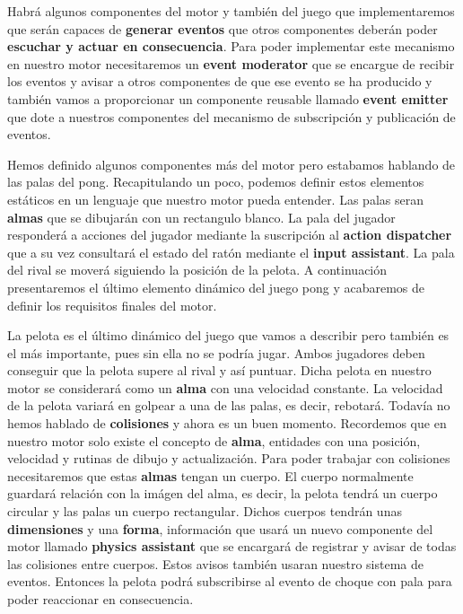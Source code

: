 \documentclass[a4paper]{article}
\begin{document}
Habrá algunos componentes del motor y también del juego que implementaremos que serán capaces de \textbf{generar eventos} que otros componentes deberán poder \textbf{escuchar y actuar en consecuencia}. Para poder implementar este mecanismo en nuestro motor necesitaremos un \textbf{event moderator} que se encargue de recibir los eventos y avisar a otros componentes de que ese evento se ha producido y también vamos a proporcionar un componente reusable llamado \textbf{event emitter} que dote a nuestros componentes del mecanismo de subscripción y publicación de eventos.

Hemos definido algunos componentes más del motor pero estabamos hablando de las palas del pong. Recapitulando un poco, podemos definir estos elementos estáticos en un lenguaje que nuestro motor pueda entender. Las palas seran \textbf{almas} que se dibujarán con un rectangulo blanco. La pala del jugador responderá a acciones del jugador mediante la suscripción al \textbf{action dispatcher} que a su vez consultará el estado del ratón mediante el \textbf{input assistant}. La pala del rival se moverá siguiendo la posición de la pelota. A continuación presentaremos el último elemento dinámico del juego pong y acabaremos de definir los requisitos finales del motor.

La pelota es el último dinámico del juego que vamos a describir pero también es el más importante, pues sin ella no se podría jugar. Ambos jugadores deben conseguir que la pelota supere al rival y así puntuar. Dicha pelota en nuestro motor se considerará como un \textbf{alma} con una velocidad constante. La velocidad de la pelota variará en golpear a una de las palas, es decir, rebotará. Todavía no hemos hablado de \textbf{colisiones} y ahora es un buen momento. Recordemos que en nuestro motor solo existe el concepto de \textbf{alma}, entidades con una posición, velocidad y rutinas de dibujo y actualización. Para poder trabajar con colisiones necesitaremos que estas \textbf{almas} tengan un cuerpo. El cuerpo normalmente guardará relación con la imágen del alma, es decir, la pelota tendrá un cuerpo circular y las palas un cuerpo rectangular. Dichos cuerpos tendrán unas \textbf{dimensiones} y una \textbf{forma}, información que usará un nuevo componente del motor llamado \textbf{physics assistant} que se encargará de registrar y avisar de todas las colisiones entre cuerpos. Estos avisos también usaran nuestro sistema de eventos. Entonces la pelota podrá subscribirse al evento de choque con pala para poder reaccionar en consecuencia.
\end{document}
